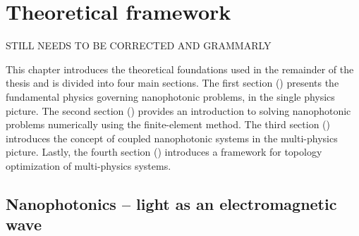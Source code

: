 \chapter{Theoretical framework}

STILL NEEDS TO BE CORRECTED AND GRAMMARLY

This chapter introduces the theoretical foundations used in the remainder of
the thesis
and is divided into four main sections. The first section
() presents the fundamental physics
governing nanophotonic problems, in the single physics picture. The second
section () provides
an introduction to solving nanophotonic problems numerically using the
finite-element method.
The third section () introduces the concept of coupled
nanophotonic systems in the multi-physics
picture. Lastly, the fourth section () introduces a
framework for topology optimization of multi-physics systems.




\section{Nanophotonics -- light as an electromagnetic
  wave}\label{sec:nanophotonics}

